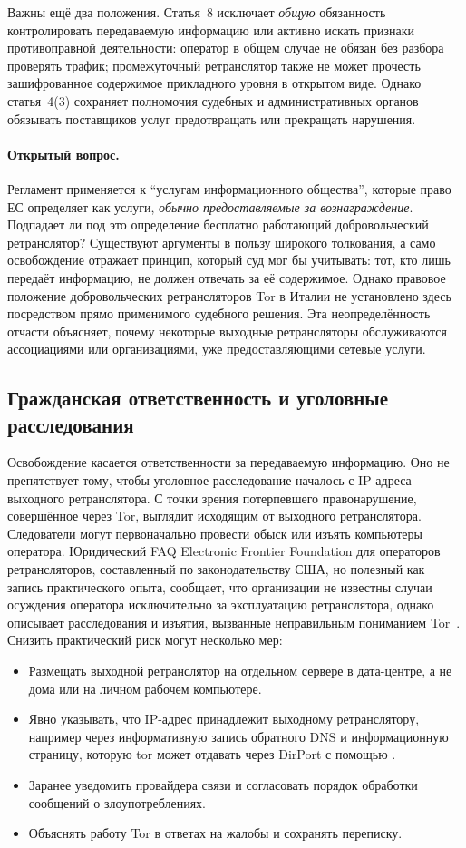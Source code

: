 Важны ещё два положения. Статья~8 исключает \emph{общую} обязанность контролировать передаваемую информацию или активно искать признаки противоправной деятельности: оператор в общем случае не обязан без разбора проверять трафик; промежуточный ретранслятор также не может прочесть зашифрованное содержимое прикладного уровня в открытом виде. Однако статья~4(3) сохраняет полномочия судебных и административных органов обязывать поставщиков услуг предотвращать или прекращать нарушения.

\paragraph{Открытый вопрос.} Регламент применяется к \enquote{услугам информационного общества}, которые право ЕС определяет как услуги, \emph{обычно предоставляемые за вознаграждение}. Подпадает ли под это определение бесплатно работающий добровольческий ретранслятор? Существуют аргументы в пользу широкого толкования, а само освобождение отражает принцип, который суд мог бы учитывать: тот, кто лишь передаёт информацию, не должен отвечать за её содержимое. Однако правовое положение добровольческих ретрансляторов Tor в Италии не установлено здесь посредством прямо применимого судебного решения. Эта неопределённость отчасти объясняет, почему некоторые выходные ретрансляторы обслуживаются ассоциациями или организациями, уже предоставляющими сетевые услуги.

\subsection{Гражданская ответственность и уголовные расследования}

Освобождение касается ответственности за передаваемую информацию. Оно не препятствует тому, чтобы уголовное расследование началось с IP-адреса выходного ретранслятора. С точки зрения потерпевшего правонарушение, совершённое через Tor, выглядит исходящим от выходного ретранслятора. Следователи могут первоначально провести обыск или изъять компьютеры оператора. Юридический FAQ Electronic Frontier Foundation для операторов ретрансляторов, составленный по законодательству США, но полезный как запись практического опыта, сообщает, что организации не известны случаи осуждения оператора исключительно за эксплуатацию ретранслятора, однако описывает расследования и изъятия, вызванные неправильным пониманием Tor~\cite{efflegalfaq}. Снизить практический риск могут несколько мер:
\begin{itemize}
  \item Размещать выходной ретранслятор на отдельном сервере в дата-центре, а не дома или на личном рабочем компьютере.
  \item Явно указывать, что IP-адрес принадлежит выходному ретранслятору, например через информативную запись обратного DNS и информационную страницу, которую tor может отдавать через DirPort с помощью .
  \item Заранее уведомить провайдера связи и согласовать порядок обработки сообщений о злоупотреблениях.
  \item Объяснять работу Tor в ответах на жалобы и сохранять переписку.
\end{itemize}

